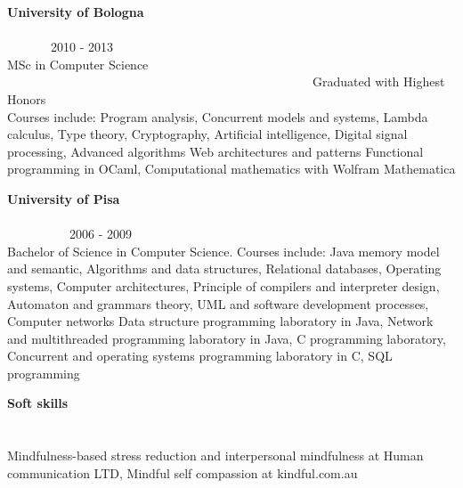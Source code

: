 \begin{resume}
        \textbf{University of Bologna} \ \ \ \ \ \ \ \ \ \ \ \ \ \ \ \ \ \ \ \ \ \ \ \ \ \ \ \ \ \ \ \ \ \ \ \ \ \ \ \ \ \ \ \ \ \ \ \ \ \ \ \ \ \ \ \ \ \ \ \ \ \ \ \ \ \ \ \ \ \ \ \ \ \ \ \ \ \ \ 2010 - 2013 \\
        MSc in Computer Science  \ \ \ \ \ \ \ \ \ \ \ \ \ \ \ \ \ \ \ \ \ \ \ \ \ \ \ \ \ \ \ \ \ \ \ \ \ \ \ \ \ \ \ \ \ \ \ \ \ Graduated with Highest Honors\\
        Courses include:
        Program analysis,
        Concurrent models and systems,
        Lambda calculus,
        Type theory,
        Cryptography,
        Artificial intelligence,
        Digital signal processing,
        Advanced algorithms
        Web architectures and patterns %
        Functional programming in OCaml, 
        Computational mathematics with Wolfram Mathematica

        \textbf{University of Pisa} \ \ \ \ \ \ \ \ \ \ \ \ \ \ \ \ \ \ \ \ \ \ \ \ \ \ \ \ \ \ \ \ \ \ \ \ \ \ \ \ \ \ \ \ \ \ \ \ \ \ \ \ \ \ \ \ \ \ \ \ \ \ \ \ \ \ \ \ \ \ \ \ \ \ \ \ \ \ \ \ \ \ 2006 - 2009 \\
        Bachelor of Science in Computer Science. Courses include:
        Java memory model and semantic,
        Algorithms and data structures,
        Relational databases,
        Operating systems,
        Computer architectures,
        Principle of compilers and interpreter design,
        Automaton and grammars theory,
        UML and software development processes,
        Computer networks
        Data structure programming laboratory in Java,
        Network and multithreaded programming laboratory in Java,
        C programming laboratory,
        Concurrent and operating systems programming laboratory in C,
        SQL programming


        \textbf{Soft skills}  \ \ \ \ \ \ \ \ \ \ \ \ \ \ \ \ \ \ \ \ \ \ \ \ \ \ \ \ \ \ \ \ \ \ \ \ \ \ \ \ \ \ \ \ \ \ \ \ \ \ \ \ \ \ \ \ \ \ \ \ \ \ \ \ \ \ \ \ \ \ \ \ \ \ \ \ \ \ \ \ \ \ \ \ \ \ \ \ \ \ \ \ \ \ \ \ \ \ \ \ \ \ \ \\
        Mindfulness-based stress reduction and interpersonal mindfulness at Human communication LTD,
        Mindful self compassion at kindful.com.au


\end{resume}
